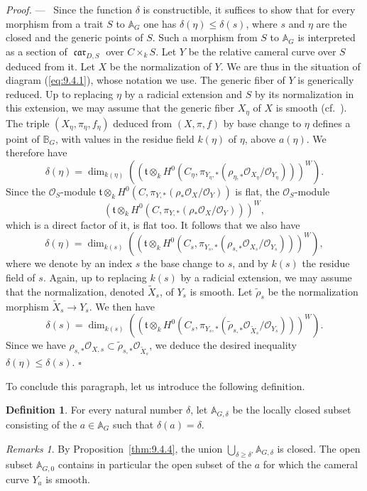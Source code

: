 \documentclass[12pt,a4paper,oneside,english,leqno]{smfart}
\numberwithin{equation}{subsection}
\newcounter{theo}
\numberwithin{theo}{subsection}
\theoremstyle{plain}
\theoremstyle{definition}
\newtheorem{definition}[theo]{Definition}
\theoremstyle{remark}
\newtheorem{remarks}[theo]{Remarks}
\newenvironment{preuve}[1][]{\medskip\noindent\textit{Proof.} #1 ---\ }%
  {\hfill\ensuremath{\square}\medskip}
\DeclareMathOperator{\car}{\mathfrak{car}}
\newcommand{\AAA}{\mathbb{A}}
\newcommand{\BBB}{\mathbb{B}}
\newcommand{\oc}{\mathcal{O}}
\newcommand{\tgo}{\mathfrak{t}}
\renewcommand{\leq}{\leqslant}
\renewcommand{\geq}{\geqslant}
\begin{document}
\begin{preuve}
Since the function $\delta$ is constructible, it suffices to show that for every morphism from a trait $S$ to $\AAA_G$ one has $\delta(\eta)\leq\delta(s)$, where $s$ and $\eta$ are the closed and the generic points of $S$. Such a morphism from $S$ to $\AAA_G$ is interpreted as a section of $\car_{D,S}$ over $C\times_k S$. Let $Y$ be the relative cameral curve over $S$ deduced from it. Let $X$ be the normalization of $Y$. We are thus in the situation of diagram (\ref{eq:9.4.1}), whose notation we use. The generic fiber of $Y$ is generically reduced. Up to replacing $\eta$ by a radicial extension and $S$ by its normalization in this extension, we may assume that the generic fiber $X_\eta$ of $X$ is smooth (cf.\ \cite[Prop.\ 17.15.14]{EGAIV4}). The triple $(X_\eta,\pi_\eta,f_\eta)$ deduced from $(X,\pi,f)$ by base change to $\eta$ defines a point of $\BBB_G$, with values in the residue field $k(\eta)$ of $\eta$, above $a(\eta)$. We therefore have
\[
\delta(\eta)=\dim_{k(\eta)}((\tgo\otimes_k H^0(C_\eta,\pi_{Y_\eta,*}(\rho_{\eta,*}\oc_{X_\eta}/\oc_{Y_\eta})))^W).
\]
Since the $\oc_S$-module $\tgo\otimes_k H^0(C,\pi_{Y,*}(\rho_*\oc_X/\oc_Y))$ is flat, the $\oc_S$-module
\[
(\tgo\otimes_k H^0(C,\pi_{Y,*}(\rho_*\oc_X/\oc_Y)))^W,
\]
which is a direct factor of it, is flat too. It follows that we also have
\[
\delta(\eta)=\dim_{k(s)}((\tgo\otimes_k H^0(C_s,\pi_{Y_s,*}(\rho_{s,*}\oc_{X_s}/\oc_{Y_s})))^W),
\]
where we denote by an index $s$ the base change to $s$, and by $k(s)$ the residue field of $s$. Again, up to replacing $k(s)$ by a radicial extension, we may assume that the normalization, denoted $\tilde{X}_s$, of $Y_s$ is smooth. Let $\tilde{\rho}_s$ be the normalization morphism $\tilde{X}_s\to Y_s$. We then have
\[
\delta(s)=\dim_{k(s)}((\tgo\otimes_k H^0(C_s,\pi_{Y_s,*}(\tilde{\rho}_{s,*}\oc_{\tilde{X}_s}/\oc_{Y_s})))^W).
\]
Since we have $\rho_{s,*}\oc_{X,s}\subset\tilde{\rho}_{s,*}\oc_{\tilde{X}_s}$, we deduce the desired inequality $\delta(\eta)\leq\delta(s)$.
\end{preuve}

To conclude this paragraph, let us introduce the following definition.

\begin{definition}\label{thm:9.4.5}
For every natural number $\delta$, let $\AAA_{G,\delta}$ be the locally closed subset consisting of the $a\in\AAA_G$ such that $\delta(a)=\delta$.
\end{definition}

\begin{remarks}\label{thm:9.4.6}
By Proposition~\ref{thm:9.4.4}, the union $\bigcup_{\delta\geq\delta'}\AAA_{G,\delta}$ is closed. The open subset $\AAA_{G,0}$ contains in particular the open subset of the $a$ for which the cameral curve $Y_a$ is smooth.
\end{remarks}
\end{document}
